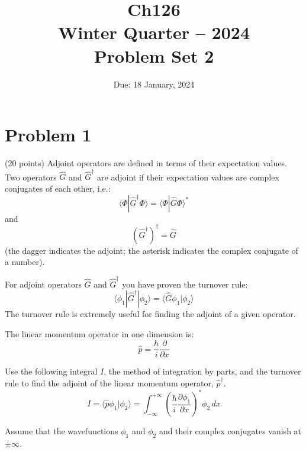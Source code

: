 \documentclass{article}
\begin{document}
\title{Ch126\\Winter Quarter -- 2024\\Problem Set 2}
\date{Due: 18 January, 2024}
\maketitle

\section{Problem 1}
(20 points) Adjoint operators are defined in terms of their expectation values. Two operators \( \hat{G} \) and \( \hat{G}^\dagger \) are adjoint if their expectation values are complex conjugates of each other, i.e.:
\begin{equation}
    \langle \Phi  | \hat{G}^\dagger \Phi  \rangle = \langle \Phi  | \hat{G} \Phi  \rangle^*
\end{equation}
and
\begin{equation}
    (\hat{G}^\dagger)^\dagger = \hat{G}
\end{equation}
(the dagger indicates the adjoint; the asterisk indicates the complex conjugate of a number).

For adjoint operators \( \hat{G} \) and \( \hat{G}^\dagger \) you have proven the turnover rule:
\begin{equation}
    \langle \phi_1 | \hat{G}^\dagger | \phi_2 \rangle = \langle \hat{G} \phi_1 | \phi_2 \rangle
\end{equation}
The turnover rule is extremely useful for finding the adjoint of a given operator.

The linear momentum operator in one dimension is:
\begin{equation}
    \hat{p} = \frac{\hbar}{i} \frac{\partial}{\partial x}
\end{equation}

Use the following integral \( I \), the method of integration by parts, and the turnover rule to find the adjoint of the linear momentum operator, \( \hat{p}^\dagger \).
\begin{equation}
    I = \langle \hat{p}\phi_1 | \phi_2 \rangle = \int_{-\infty}^{+\infty} \left( \frac{\hbar}{i} \frac{\partial \phi_1}{\partial x} \right)^* \phi_2 \, dx
\end{equation}

Assume that the wavefunctions \( \phi_1 \) and \( \phi_2 \) and their complex conjugates vanish at \( \pm\infty \).
\end{document}
